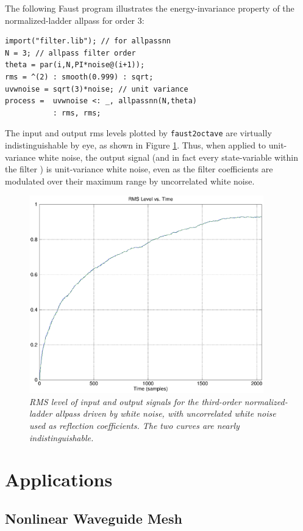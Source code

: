 \documentclass[twoside,a4paper]{article}
\begin{document}
The following Faust program illustrates the energy-invariance property
of the normalized-ladder allpass for order 3:
\begin{verbatim}
import("filter.lib"); // for allpassnn
N = 3; // allpass filter order
theta = par(i,N,PI*noise@(i+1));
rms = ^(2) : smooth(0.999) : sqrt;
uvwnoise = sqrt(3)*noise; // unit variance
process =  uvwnoise <: _, allpassnn(N,theta) 
           : rms, rms;
\end{verbatim}
The input and output rms levels plotted by \texttt{faust2octave} are
virtually indistinguishable by eye, as shown in Figure \ref{tapnn2}.
Thus, when applied to unit-variance white noise, the output signal
(and in fact every state-variable within the filter
\cite{GrayAndMarkel75}) is unit-variance white noise, even as the
filter coefficients are modulated over their maximum range by
uncorrelated white noise.

\begin{figure}[ht]
\center
\includegraphics[width=4in]{eps/tapnn2.eps}
\caption{\label{tapnn2}{\it RMS level of input and output signals
for the third-order normalized-ladder allpass driven by white noise,
with uncorrelated white noise used as reflection coefficients.  The two
curves are nearly indistinguishable.}}
\end{figure} 

\section{Applications}

\subsection{Nonlinear Waveguide Mesh}
\end{document}
